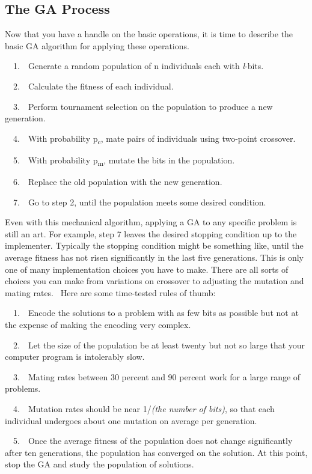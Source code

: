 \subsection{The GA Process}

Now that you have a handle on the basic operations, it is time to
describe the basic GA algorithm for applying these operations. 

\ \ 1.\ \ Generate a random population of n individuals each with
\textit{l}{}-bits.

\ \ 2.\ \ Calculate the fitness of each individual.

\ \ 3.\ \ Perform tournament selection on the population to produce a
new generation.

\ \ 4.\ \ With probability p\textsubscript{c}, mate pairs of individuals
using two-point crossover.

\ \ 5.\ \ With probability p\textsubscript{m}, mutate the bits in the
population.

\ \ 6.\ \ Replace the old population with the new generation.

\ \ 7.\ \ Go to step 2, until the population meets some desired
condition.

Even with this mechanical algorithm, applying a GA to any specific
problem is still an art. For example, step 7 leaves the desired
stopping condition up to the implementer. Typically the stopping
condition might be something like, until the average fitness has not
risen significantly in the last five generations. This is only one of
many implementation choices you have to make. There are all sorts of
choices you can make from variations on crossover to adjusting the
mutation and mating rates. \ Here are some time-tested rules of thumb:

\ \ 1.\ \ Encode the solutions to a problem with as few bits as possible
but not at the expense of making the encoding very complex. 

\ \ 2.\ \ Let the size of the population be at least twenty but not so
large that your computer program is intolerably slow. 

\ \ 3.\ \ Mating rates between 30 percent and 90 percent work for a
large range of problems.

\ \ 4.\ \ Mutation rates should be near 1/\textit{(the number of bits)},
so that each
individual undergoes about one mutation on average per generation.

\ \ 5.\ \ Once the average fitness of the population does not change
significantly after ten generations, the population has converged on
the solution. At this point, stop the GA and study the population of
solutions.

